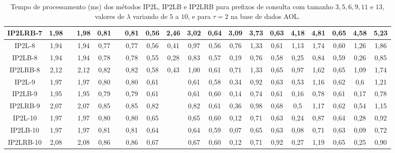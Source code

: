 \begin{table}[h]
{\begin{tabular}{c|ccc|ccc|ccc|ccc|ccc|ccc|}
\multicolumn{1}{|c|}{IP2LRB-7}  & 1,98 &  & 1,98 & 0,81 &      & 0,81 & 0,56 & 2,46  & 3,02  & 0,64 & 3,09  & 3,73  & 0,63 & 4,18  & 4,81  & 0,65 & 4,58  & 5,23  \\ \hline
\multicolumn{1}{|c|}{IP2L-8}    & 1,94 &  & 1,94 & 0,77 &      & 0,77 & 0,56 & 0,41  & 0,97  & 0,56 & 0,76  & 1,33  & 0,61 & 1,13  & 1,74  & 0,60 & 1,26  & 1,86  \\
\multicolumn{1}{|c|}{IP2LB-8}   & 1,94 &  & 1,94 & 0,78 &      & 0,78 & 0,55 & 0,28  & 0,83  & 0,57 & 0,19  & 0,76  & 0,58 & 0,25  & 0,84  & 0,59 & 0,26  & 0,85  \\
\multicolumn{1}{|c|}{IP2LRB-8}  & 2,12 &  & 2,12 & 0,82 &      & 0,82 & 0,58 & 0,43  & 1,00  & 0,61 & 0,71  & 1,33  & 0,65 & 0,97  & 1,62  & 0,65 & 1,09  & 1,74  \\ \hline
\multicolumn{1}{|c|}{IP2L-9}    & 1,97 &  & 1,97 & 0,80 &      & 0,80 & 0,61 &       & 0,61  & 0,58 & 0,34  & 0,92  & 0,63 & 0,53  & 1,16  & 0,62 & 0,6   & 1,21  \\
\multicolumn{1}{|c|}{IP2LB-9}   & 1,95 &  & 1,95 & 0,79 &      & 0,79 & 0,61 &       & 0,61  & 0,60 & 0,14  & 0,74  & 0,61 & 0,16  & 0,78  & 0,61 & 0,17  & 0,78  \\
\multicolumn{1}{|c|}{IP2LRB-9}  & 2,07 &  & 2,07 & 0,85 &      & 0,85 & 0,82 &       & 0,82  & 0,61 & 0,36  & 0,98  & 0,68 & 0,5   & 1,17  & 0,62 & 0,54  & 1,15  \\ \hline
\multicolumn{1}{|c|}{IP2L-10}   & 1,97 &  & 1,97 & 0,80 &      & 0,80 & 0,65 &       & 0,65  & 0,60 & 0,12  & 0,71  & 0,63 & 0,24  & 0,87  & 0,64 & 0,28  & 0,92  \\
\multicolumn{1}{|c|}{IP2LB-10}  & 1,97 &  & 1,97 & 0,81 &      & 0,81 & 0,64 &       & 0,64  & 0,59 & 0,07  & 0,65  & 0,63 & 0,08  & 0,71  & 0,63 & 0,09  & 0,72  \\
\multicolumn{1}{|c|}{IP2LRB-10} & 2,08 &  & 2,08 & 0,86 &      & 0,86 & 0,67 &       & 0,67  & 0,60 & 0,12  & 0,71  & 0,92 & 0,27  & 1,19  & 0,65 & 0,25  & 0,90  \\ \hline
\end{tabular}%
}
\caption{Tempo de processamento (ms) dos métodos IP2L, IP2LB e IP2LRB para prefixos de consulta com tamanho $3,5,6,9,11$ e $13$, valores de $\lambda$ variando de $5$ a $10$, e para $\tau=2$ na base de dados AOL.}
\label{tab:methods-processing-time-tau-2-AOL}
\end{table}


